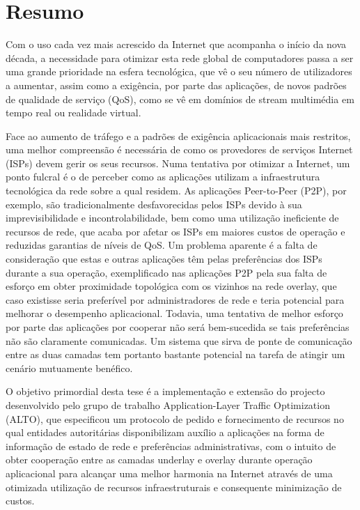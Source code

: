 \chapter{Resumo}

    Com o uso cada vez mais acrescido da Internet que acompanha o início da nova década, a necessidade para otimizar esta rede global de computadores passa a ser uma grande prioridade na esfera tecnológica, que vê o seu número de utilizadores a aumentar, assim como a exigência, por parte das aplicações, de novos padrões de qualidade de serviço (QoS), como se vê em domínios de stream multimédia em tempo real ou realidade virtual.

    Face ao aumento de tráfego e a padrões de exigência aplicacionais mais restritos, uma melhor compreensão é necessária de como os provedores de serviços Internet (ISPs) devem gerir os seus recursos.
    Numa tentativa por otimizar a Internet, um ponto fulcral é o de perceber como as aplicações utilizam a infraestrutura tecnológica da rede sobre a qual residem.
    As aplicações Peer-to-Peer (P2P), por exemplo, são tradicionalmente desfavorecidas pelos ISPs devido à sua imprevisibilidade e incontrolabilidade, bem como uma utilização ineficiente de recursos de rede, que acaba por afetar os ISPs em maiores custos de operação e reduzidas garantias de níveis de QoS.
    Um problema aparente é a falta de consideração que estas e outras aplicações têm pelas preferências dos ISPs durante a sua operação, exemplificado nas aplicações P2P pela sua falta de esforço em obter proximidade topológica com os vizinhos na rede overlay, que caso existisse seria preferível por administradores de rede e teria potencial para melhorar o desempenho aplicacional.
    Todavia, uma tentativa de melhor esforço por parte das aplicações por cooperar não será bem-sucedida se tais preferências não são claramente comunicadas.
    Um sistema que sirva de ponte de comunicação entre as duas camadas tem portanto bastante potencial na tarefa de atingir um cenário mutuamente benéfico.

    O objetivo primordial desta tese é a implementação e extensão do projecto desenvolvido pelo grupo de trabalho Application-Layer Traffic Optimization (ALTO), que especificou um protocolo de pedido e fornecimento de recursos no qual entidades autoritárias disponibilizam auxílio a aplicações na forma de informação de estado de rede e preferências administrativas, com o intuito de obter cooperação entre as camadas underlay e overlay durante operação aplicacional para alcançar uma melhor harmonia na Internet através de uma otimizada utilização de recursos infraestruturais e consequente minimização de custos.

